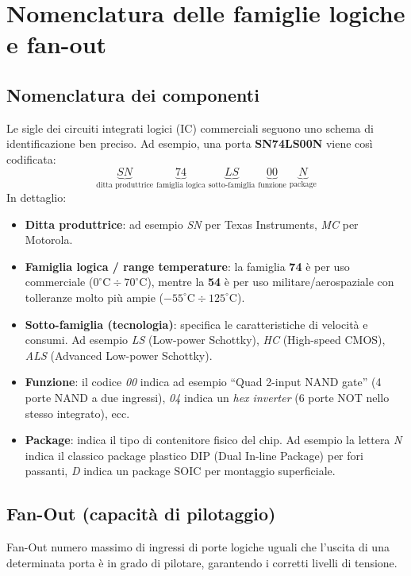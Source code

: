 \section{Nomenclatura delle famiglie logiche e fan-out}

\subsection{Nomenclatura dei componenti}
Le sigle dei circuiti integrati logici (IC) commerciali seguono uno schema di identificazione ben preciso. Ad esempio, una porta \textbf{SN74LS00N} viene così codificata:
\[
\underbrace{SN}_{\text{ditta produttrice}}\;\underbrace{74}_{\text{famiglia logica}}\;\underbrace{LS}_{\text{sotto-famiglia}}\;\underbrace{00}_{\text{funzione}}\;\underbrace{N}_{\text{package}}
\]
In dettaglio:
\begin{itemize}[leftmargin=1.5em]
    \item \textbf{Ditta produttrice}: ad esempio \emph{SN} per Texas Instruments, \emph{MC} per Motorola.
    \item \textbf{Famiglia logica / range temperature}: la famiglia \textbf{74} è per uso commerciale ($0^\circ\text{C} \div 70^\circ\text{C}$), mentre la \textbf{54} è per uso militare/aerospaziale con tolleranze molto più ampie ($-55^\circ\text{C} \div 125^\circ\text{C}$).
    \item \textbf{Sotto-famiglia (tecnologia)}: specifica le caratteristiche di velocità e consumi. Ad esempio \emph{LS} (Low-power Schottky), \emph{HC} (High-speed CMOS), \emph{ALS} (Advanced Low-power Schottky).
    \item \textbf{Funzione}: il codice \emph{00} indica ad esempio ``Quad 2-input NAND gate'' (4 porte NAND a due ingressi), \emph{04} indica un \emph{hex inverter} (6 porte NOT nello stesso integrato), ecc.
    \item \textbf{Package}: indica il tipo di contenitore fisico del chip. Ad esempio la lettera \emph{N} indica il classico package plastico DIP (Dual In-line Package) per fori passanti, \emph{D} indica un package SOIC per montaggio superficiale.
\end{itemize}

\subsection{Fan-Out (capacità di pilotaggio)}

\begin{definizione}{Fan-Out}
numero massimo di ingressi di porte logiche uguali che l'uscita di una determinata porta è in grado di pilotare, garantendo i corretti livelli di tensione.
\end{definizione}

